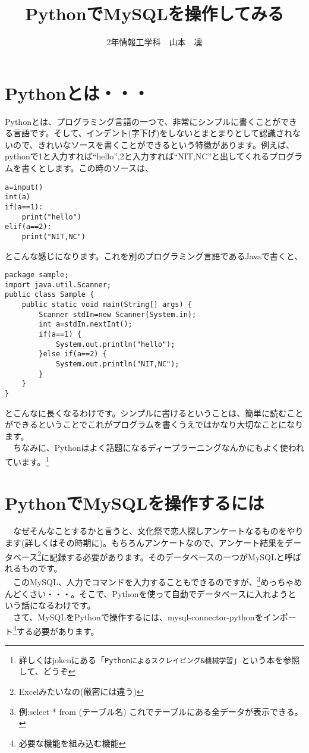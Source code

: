 \documentclass{jsarticle}
\begin{document}
\title{PythonでMySQLを操作してみる}
\author{2年情報工学科　山本　凜}
\date{}
\maketitle

\section{Pythonとは・・・}
Pythonとは、プログラミング言語の一つで、非常にシンプルに書くことができる言語です。そして、インデント(字下げ)をしないとまとまりとして認識されないので、きれいなソースを書くことができるという特徴があります。例えば、pythonで1と入力すれば“hello”,2と入力すれば“NIT,NC”と出してくれるプログラムを書くとします。この時のソースは、
\begin{lstlisting}[basicstyle=\ttfamily\footnotesize, frame=single]
a=input()
int(a)
if(a==1):
	print("hello")
elif(a==2):
	print("NIT,NC")
 \end{lstlisting}
とこんな感じになります。これを別のプログラミング言語であるJavaで書くと、
\begin{lstlisting}[basicstyle=\ttfamily\footnotesize, frame=single]
package sample;
import java.util.Scanner;
public class Sample {
	public static void main(String[] args) {
		Scanner stdIn=new Scanner(System.in);
		int a=stdIn.nextInt();
		if(a==1) {
			System.out.println("hello");
		}else if(a==2) {
			System.out.println("NIT,NC");
		}
	}
}
\end{lstlisting}
とこんなに長くなるわけです。シンプルに書けるということは、簡単に読むことができるということでこれがプログラムを書くうえではかなり大切なことになります。\\
　ちなみに、Pythonはよく話題になるディープラーニングなんかにもよく使われています。\footnote{詳しくはjokenにある「\verb|Pythonによるスクレイピング&機械学習|」という本を参照して、どうぞ}

\section{PythonでMySQLを操作するには}
　なぜそんなことするかと言うと、文化祭で恋人探しアンケートなるものをやります(詳しくはその時期に)。もちろんアンケートなので、アンケート結果をデータベース\footnote{Excelみたいなの(厳密には違う)}に記録する必要があります。そのデータベースの一つがMySQLと呼ばれるものです。\\
　このMySQL、人力でコマンドを入力することもできるのですが、\footnote{例:select * from (テーブル名) これでテーブルにある全データが表示できる。}めっちゃめんどくさい・・・。そこで、Pythonを使って自動でデータベースに入れようという話になるわけです。\\
　さて、MySQLをPythonで操作するには、mysql-connector-pythonをインポート\footnote{必要な機能を組み込む機能}する必要があります。
\end{document}

